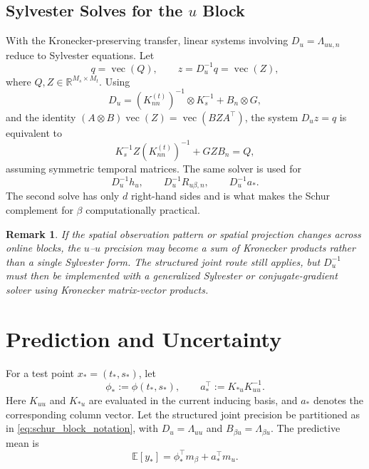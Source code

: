 \documentclass[12pt]{article}
\newtheorem{remark}{Remark}
\newcommand{\E}{\mathbb{E}}
\newcommand{\vecop}{\operatorname{vec}}
\begin{document}
\subsection{Sylvester Solves for the $u$ Block}
\label{subsec:sylvester_reformulation}

With the Kronecker-preserving transfer, linear systems involving
$D_u=\Lambda_{uu,n}$ reduce to Sylvester equations. Let
\begin{equation}
    q=\vecop(Q),
    \qquad
    z=D_u^{-1}q=\vecop(Z),
\end{equation}
where $Q,Z\in\mathbb{R}^{M_s\times M_t}$. Using
\begin{equation}
    D_u=(K_{nn}^{(t)})^{-1}\otimes K_s^{-1}+B_n\otimes G,
\end{equation}
and the identity $(A\otimes B)\vecop(Z)=\vecop(BZA^\top)$, the system
$D_uz=q$ is equivalent to
\begin{equation}
    K_s^{-1}Z(K_{nn}^{(t)})^{-1}+GZB_n=Q,
    \label{eq:sylvester_after_ssgp_transfer}
\end{equation}
assuming symmetric temporal matrices. The same solver is used for
\begin{equation}
    D_u^{-1}h_u,
    \qquad
    D_u^{-1}R_{u\beta,n},
    \qquad
    D_u^{-1}a_*.
\end{equation}
The second solve has only $d$ right-hand sides and is what makes the Schur complement
for $\beta$ computationally practical.

\begin{remark}
If the spatial observation pattern or spatial projection changes across online blocks,
the $u$--$u$ precision may become a sum of Kronecker products rather than a single
Sylvester form. The structured joint route still applies, but $D_u^{-1}$ must then be
implemented with a generalized Sylvester or conjugate-gradient solver using Kronecker
matrix-vector products.
\end{remark}

\section{Prediction and Uncertainty}
\label{sec:prediction_uncertainty}

For a test point \(x_*=(t_*,s_*)\), let
\begin{equation}
    \phi_*:=\phi(t_*,s_*),
    \qquad
    a_*^\top:=K_{*u}K_{uu}^{-1}.
\end{equation}
Here \(K_{uu}\) and \(K_{*u}\) are evaluated in the current inducing basis, and
\(a_*\) denotes the corresponding column vector.  Let the structured joint
precision be partitioned as in \eqref{eq:schur_block_notation}, with
\(D_u=\Lambda_{uu}\) and \(B_{\beta u}=\Lambda_{\beta u}\).  The predictive mean is
\begin{equation}
    \E[y_*]
    =
    \phi_*^\top m_\beta+a_*^\top m_u .
    \label{eq:structured_predictive_mean}
\end{equation}
\end{document}

